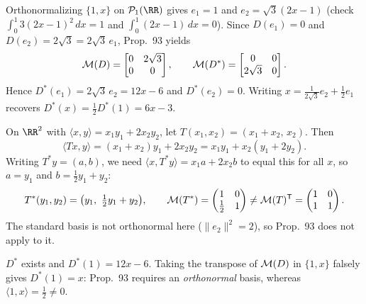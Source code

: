 \documentclass[10pt]{scrartcl}
\begin{document}
\begin{example*}
  Orthonormalizing $\{1,x\}$ on $\PP_1(\RR)$ gives $e_1=1$ and $e_2=\sqrt{3}(2x-1)$ (check $\int_0^1 3(2x-1)^2\,dx=1$ and $\int_0^1 (2x-1)\,dx=0$). Since $D(e_1)=0$ and $D(e_2)=2\sqrt{3}=2\sqrt{3}\,e_1$, Prop.~93 yields
  \[
    \mathcal M(D)=\begin{bmatrix}0&2\sqrt{3}\\0&0\end{bmatrix}, \qquad
    \mathcal M(D^*)=\begin{bmatrix}0&0\\2\sqrt{3}&0\end{bmatrix}.
  \]
  Hence $D^*(e_1)=2\sqrt{3}\,e_2=12x-6$ and $D^*(e_2)=0$. Writing $x=\frac{1}{2\sqrt{3}}e_2+\frac12 e_1$ recovers $D^*(x)=\frac12 D^*(1)=6x-3$.
\end{example*}

\begin{example*}
  On $\RR^2$ with $\langle x,y\rangle=x_1y_1+2x_2y_2$, let $T(x_1,x_2)=(x_1+x_2,\,x_2)$. Then
  \[ \langle Tx,y\rangle=(x_1+x_2)y_1+2x_2y_2=x_1y_1+x_2(y_1+2y_2). \]
  Writing $T^*y=(a,b)$, we need $\langle x,T^*y\rangle=x_1a+2x_2b$ to equal this for all $x$, so $a=y_1$ and $b=\frac12y_1+y_2$:
  \[ T^*(y_1,y_2)=\bigl(y_1,\ \tfrac12y_1+y_2\bigr),\qquad \MM(T^*)=\begin{pmatrix}1&0\\ \frac12&1\end{pmatrix}\ne\MM(T)^{\mathsf T}=\begin{pmatrix}1&0\\1&1\end{pmatrix}. \]
  The standard basis is not orthonormal here ($\|e_2\|^2=2$), so Prop.~93 does not apply to it.
\end{example*}

\revisit $D^*$ exists and $D^*(1)=12x-6$. Taking the transpose of $\mathcal M(D)$ in $\{1,x\}$ falsely gives $D^*(1)=x$: Prop.~93 requires an \emph{orthonormal} basis, whereas $\langle 1,x\rangle=\frac12\neq 0$.
\end{document}
